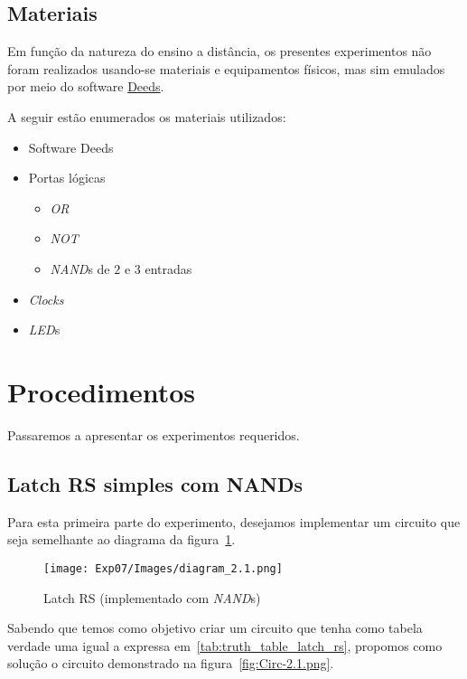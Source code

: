 \documentclass[12pt]{article}
\begin{document}
\subsection{Materiais}\label{sec:Materiais}

Em função da natureza do ensino a distância, os presentes experimentos não foram
realizados usando-se materiais e equipamentos físicos, mas sim emulados por meio
do software
\href{https://www.digitalelectronicsdeeds.com/downloads.html}{Deeds}.

A seguir estão enumerados os materiais utilizados:
\begin{itemize}
    \item Software Deeds
    \item Portas lógicas
    \begin{itemize}
      \item \emph{OR}
      \item \emph{NOT}
      \item \emph{NAND}s de $2$ e $3$ entradas
    \end{itemize}
    \item \emph{Clocks}
    \item \emph{LED}s
\end{itemize}

\section{Procedimentos}\label{sec:Procedimentos}

Passaremos a apresentar os experimentos requeridos.

\subsection{Latch RS simples com \textbf{NAND}s}\label{sec:2.1}

Para esta primeira parte do experimento, desejamos implementar um circuito que
seja semelhante ao diagrama da figura~\ref{fig:diagram_2.1.png}.

\begin{figure}[H]
  \centering
  \texttt{[image: Exp07/Images/diagram\_2.1.png]}
  \caption{Latch RS (implementado com \emph{NAND}s)}\label{fig:diagram_2.1.png}
\end{figure}

Sabendo que temos como objetivo criar um circuito que tenha como tabela verdade
uma igual a expressa em~\ref{tab:truth_table_latch_rs}, propomos como solução o
circuito demonstrado na figura~\ref{fig:Circ-2.1.png}.
\end{document}
